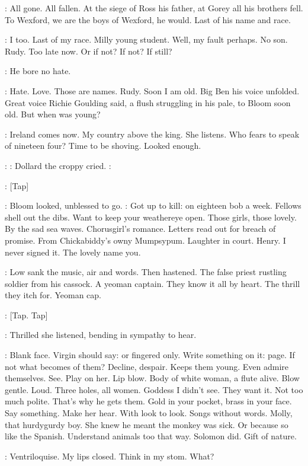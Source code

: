 \BloomInt:
All gone. All fallen. At the siege of Ross his father, at Gorey all his
brothers fell. To Wexford, we are the boys of Wexford, he would. Last of
his name and race.

\BloomInt:
I too. Last of my race. Milly young student. Well, my fault perhaps.
No son. Rudy. Too late now. Or if not? If not? If still?

\BloomInt:
He bore no hate.

\BloomInt:
Hate. Love. Those are names. Rudy. Soon I am old. Big Ben his voice
unfolded.
Great voice Richie Goulding said, a flush struggling in his
pale, to Bloom soon old. But when was young?

\BloomInt:
Ireland comes now. My country above the king. She listens. Who
fears to speak of nineteen four? Time to be shoving. Looked enough.

\dollard:
:
Dollard the croppy cried.
\dollard:

\stripling:
[Tap]

:
Bloom looked, unblessed to go.
\BloomInt:
Got up to kill: on eighteen bob a
week. Fellows shell out the dibs. Want to keep your weathereye open. Those
girls, those lovely. By the sad sea waves. Chorusgirl's romance. Letters
read out for breach of promise. From Chickabiddy's owny Mumpsypum.
Laughter in court.
Henry. I never signed it. The lovely name you.

:
Low sank the music, air and words. Then hastened. The false priest
rustling soldier from his cassock. A yeoman captain. They know it all by
heart. The thrill they itch for. Yeoman cap.

\stripling:
[Tap. Tap]

:
Thrilled she listened, bending in sympathy to hear.

\BloomInt:
Blank face. Virgin should say: or fingered only. Write something on
it: page. If not what becomes of them? Decline, despair. Keeps them young.
Even admire themselves. See. Play on her. Lip blow. Body of white woman,
a flute alive. Blow gentle. Loud. Three holes, all women. Goddess I didn't
see. They want it.
Not too much polite. That's why he gets them. Gold in
your pocket, brass in your face. Say something. Make her hear. With look
to look. Songs without words. Molly, that hurdygurdy boy. She knew he
meant the monkey was sick. Or because so like the Spanish. Understand
animals too that way. Solomon did. Gift of nature.

\BloomInt:
Ventriloquise. My lips closed. Think in my stom. What?

